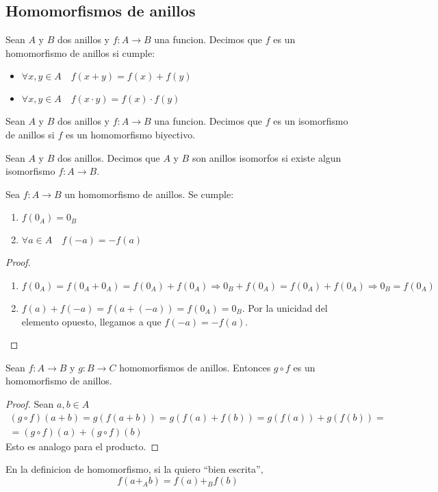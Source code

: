 \subsection{Homomorfismos de anillos}
\begin{definition}[Homomorfismo]
	Sean \(A \) y \(B \) dos anillos y \(f \colon A \to B \) una funcion. Decimos que \(f \) es un homomorfismo de anillos si cumple:
	\begin{itemize}
		\item \(\forall x,y \in A \quad f(x + y ) = f(x) + f(y )\)
		\item \(\forall x,y \in A \quad f(x \cdot y ) = f(x) \cdot f(y )\)
	\end{itemize}
\end{definition}
\begin{definition}[Isomorfismo]
	Sean \(A \) y \(B \) dos anillos y \(f \colon A \to B \) una funcion. Decimos que \(f \) es un isomorfismo de anillos si \(f \) es un homomorfismo biyectivo.
\end{definition}
\begin{definition}
	Sean \(A \) y \(B \) dos anillos. Decimos que \(A \) y \(B \) son anillos isomorfos si existe algun isomorfismo \(f \colon A \to B \).
\end{definition}
\begin{proposition}
	Sea \(f \colon A \to B \) un homomorfismo de anillos. Se cumple:
	\begin{enumerate}
		\item \(f(0_A) = 0_B  \)
		\item \(\forall a \in A \quad f(-a) = -f(a )\)
	\end{enumerate}
\end{proposition}
\begin{proof}
	~\begin{enumerate}
		\item \(f(0_A) = f(0_A + 0_A) = f(0_A) + f(0_A) \Rightarrow 0_B + f(0_A) = f(0_A) + f(0_A) \Rightarrow 0_B = f(0_A) \)
		\item \(f(a) + f(-a) = f(a + (-a)) = f(0_A) = 0_B\). Por la unicidad del elemento opuesto, llegamos a que \(f(-a) = -f(a )\).
	\end{enumerate}
\end{proof}

\begin{proposition}
	Sean \(f \colon A \to B\) y \(g \colon B \to C \) homomorfismos de anillos. Entonces \(g \circ f \) es un homomorfismo de anillos.
\end{proposition}
\begin{proof}
	Sean \(a,b \in A \)
	\begin{multline*}
		(g \circ f)(a+b) = g(f(a + b)) = g(f(a) + f(b)) = g(f(a)) + g(f(b)) = \\  = (g \circ f)(a) + (g \circ f)(b)
	\end{multline*}
	Esto es analogo para el producto.
\end{proof}
\begin{remark}
	En la definicion de homomorfismo, si la quiero ``bien escrita'',
	\[
		f(a +_A b) = f(a) +_B f(b )
	\]
\end{remark}

